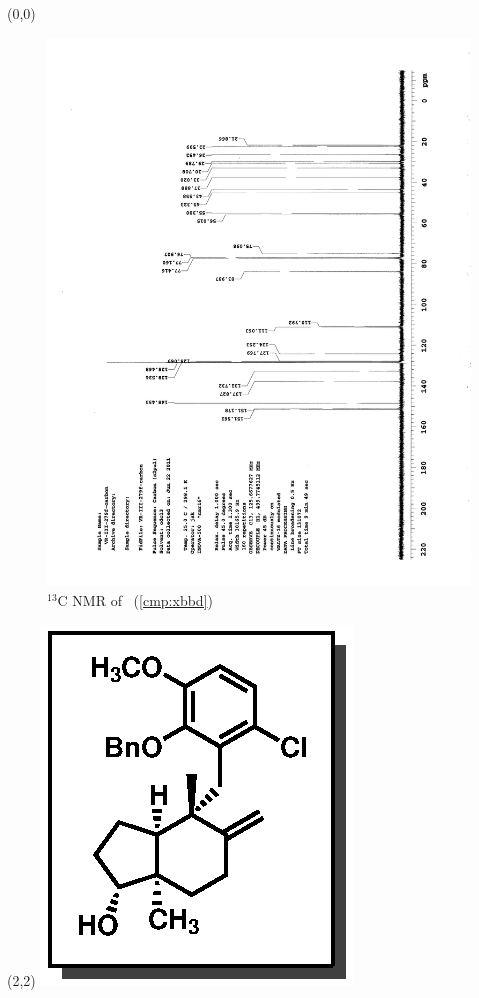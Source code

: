 \clearpage
\begin{textblock}{20}(0,0)
\begin{figure}[htb]
\caption{$^{13}$C NMR of  \CMPxbbd\ (\ref{cmp:xbbd})}
\includegraphics[scale=0.75, trim = 0mm 0mm 0mm 5mm,
clip]{chp_singlecarbon/images/nmr/xbbdC}
\vspace{-100pt}
\end{figure}
\end{textblock}
\begin{textblock}{1}(2,2)
\includegraphics[scale=0.8, angle=90]{chp_singlecarbon/images/xbbd}
\end{textblock}
\clearpage

